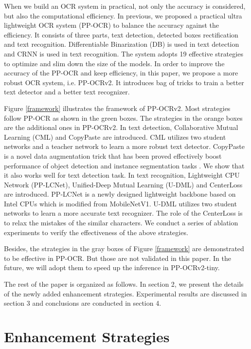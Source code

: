 \documentclass[letterpaper]{article} %
\begin{document}
When we build an OCR system in practical, not only the accuracy is considered, but also the computational efficiency. In previous, we proposed a practical ultra lightweight OCR system (PP-OCR) \cite{du2020pp} to balance the accuracy against the efficiency. It consists of three parts, text detection, detected boxes rectification and text recognition. Differentiable Binarization (DB) \cite{liao2020real} is used in text detection and CRNN \cite{shi2016end} is used in text recognition. The system adopts 19 effective strategies to optimize and slim down the size of the models. In order to improve the accuracy of the PP-OCR and keep efficiency, in this paper, we propose a more robust OCR system, i.e. PP-OCRv2. It introduces bag of tricks to train a better text detector and a better text recognizer.

Figure \ref{framework} illustrates the framework of PP-OCRv2. Most strategies follow PP-OCR as shown in the green boxes. The strategies in the orange boxes are the additional ones in PP-OCRv2. In text detection, Collaborative Mutual Learning (CML) and CopyPaste are introduced. CML utilizes two student networks and a teacher network to learn a more robust text detector. CopyPaste is a novel data augmentation trick that has been proved effectively boost performance of object detection and instance segmentation tasks \cite{ghiasi2021simple}. We show that it also works well for text detection task. In text recognition, Lightweight CPU Network (PP-LCNet)\cite{cui2021pplcnet}, Unified-Deep Mutual Learning (U-DML) and CenterLoss are introduced. PP-LCNet is a newly designed lightweight backbone based on Intel CPUs which is modified from MobileNetV1\cite{1704.04861}. U-DML utilizes two student networks to learn a more accurate text recognizer. The role of the CenterLoss is to relax the mistakes of the similar characters. We conduct a series of ablation experiments to verify the effectiveness of the above strategies.

Besides, the strategies in the gray boxes of Figure \ref{framework} are demonstrated to be effective in PP-OCR. But those are not validated in this paper. In the future, we will adopt them to speed up the inference in PP-OCRv2-tiny. 

The rest of the paper is organized as follows. In section 2, we present the details of the newly added enhancement strategies. Experimental results are discussed in section 3 and conclusions are conducted in section 4.

\section{Enhancement Strategies}
\end{document}
